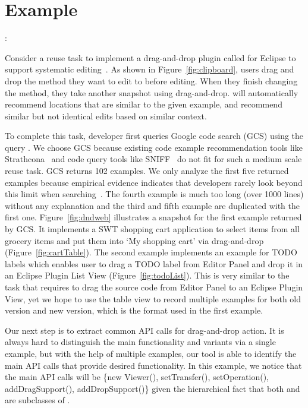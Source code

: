 \section{Example}
:
   
Consider a reuse task to implement a drag-and-drop plugin called \tool for Eclipse to support systematic editing~\cite{Meng:sydit11}. As shown in Figure~\ref{fig:clipboard}, users drag and drop the method they want to edit to \tool before editing. When they finish changing the method, they take another snapshot using drag-and-drop. \tool will automatically recommend locations that  are similar to the given example, and recommend similar but not identical edits based on similar context. 

To complete this task, developer first queries Google code search (GCS) using the query . We choose GCS because existing code example recommendation tools like Strathcona~\cite{Holmes:structural05} and code query tools like SNIFF~\cite{sniff:Sen09}  do not fit for such a medium scale reuse task. GCS returns 102 examples. We only analyze the first five returned examples because empirical evidence indicates that developers rarely look beyond this limit when searching~\cite{Starke:searchNum09}. The fourth example is much too long (over 1000 lines) without any explanation and the third and fifth example are duplicated with the first one. Figure~\ref{fig:dndweb} illustrates a snapshot for the first example returned by GCS. It implements a SWT shopping cart application to select items from all grocery items and put them into `My shopping cart' via drag-and-drop (Figure~\ref{fig:cartTable}). The second example implements an example for TODO labels which enables user to drag a TODO label from Editor Panel and drop it in an Eclipse Plugin List View (Figure~\ref{fig:todoList}). This is very similar to the task that requires to drag the source code from Editor Panel to an Eclipse Plugin View, yet we hope to use the table view to record multiple examples for both old version and new version, which is the format used in the first example. 

Our next step is to extract common API calls for drag-and-drop action. It is always hard to distinguish the main functionality and variants via a single example, but with the help of multiple examples, our tool is able to identify the main API calls that provide desired functionality. In this example, we notice that the main API calls will be \{new Viewer(), setTransfer(), setOperation(), addDragSupport(), addDropSupport()\} given the hierarchical fact that both  and  are subclasses of . 

